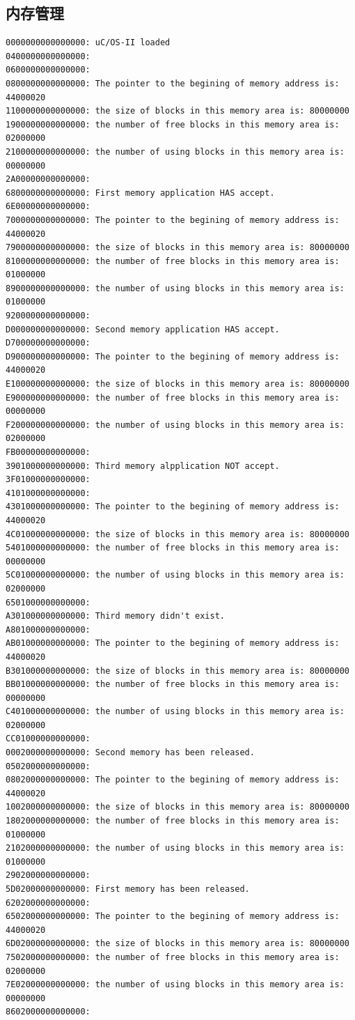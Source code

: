 \documentclass{ctexart}
\begin{document}
    \subsection{内存管理}
    \begin{lstlisting}[language={}]
0000000000000000: uC/OS-II loaded
0400000000000000:
0600000000000000:
0800000000000000: The pointer to the begining of memory address is: 44000020
1100000000000000: the size of blocks in this memory area is: 80000000
1900000000000000: the number of free blocks in this memory area is: 02000000
2100000000000000: the number of using blocks in this memory area is: 00000000
2A00000000000000:
6800000000000000: First memory application HAS accept.
6E00000000000000:
7000000000000000: The pointer to the begining of memory address is: 44000020
7900000000000000: the size of blocks in this memory area is: 80000000
8100000000000000: the number of free blocks in this memory area is: 01000000
8900000000000000: the number of using blocks in this memory area is: 01000000
9200000000000000:
D000000000000000: Second memory application HAS accept.
D700000000000000:
D900000000000000: The pointer to the begining of memory address is: 44000020
E100000000000000: the size of blocks in this memory area is: 80000000
E900000000000000: the number of free blocks in this memory area is: 00000000
F200000000000000: the number of using blocks in this memory area is: 02000000
FB00000000000000:
3901000000000000: Third memory alpplication NOT accept.
3F01000000000000:
4101000000000000:
4301000000000000: The pointer to the begining of memory address is: 44000020
4C01000000000000: the size of blocks in this memory area is: 80000000
5401000000000000: the number of free blocks in this memory area is: 00000000
5C01000000000000: the number of using blocks in this memory area is: 02000000
6501000000000000:
A301000000000000: Third memory didn't exist.
A801000000000000:
AB01000000000000: The pointer to the begining of memory address is: 44000020
B301000000000000: the size of blocks in this memory area is: 80000000
BB01000000000000: the number of free blocks in this memory area is: 00000000
C401000000000000: the number of using blocks in this memory area is: 02000000
CC01000000000000:
0002000000000000: Second memory has been released.
0502000000000000:
0802000000000000: The pointer to the begining of memory address is: 44000020
1002000000000000: the size of blocks in this memory area is: 80000000
1802000000000000: the number of free blocks in this memory area is: 01000000
2102000000000000: the number of using blocks in this memory area is: 01000000
2902000000000000:
5D02000000000000: First memory has been released.
6202000000000000:
6502000000000000: The pointer to the begining of memory address is: 44000020
6D02000000000000: the size of blocks in this memory area is: 80000000
7502000000000000: the number of free blocks in this memory area is: 02000000
7E02000000000000: the number of using blocks in this memory area is: 00000000
8602000000000000:
    \end{lstlisting}
\end{document}
